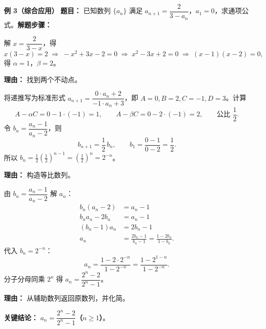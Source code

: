 \begin{examplebox}
	\medskip
	\textbf{\textcolor{CExample}{例 3（综合应用）}}
	\textbf{\textcolor{CExample}{题目：}} 已知数列 $\{a_n\}$ 满足 $a_{n+1}=\dfrac{2}{3-a_n}$，$a_1=0$，求通项公式。\textbf{\textcolor{CExample}{解题步骤：}}
	\begin{description}[style=nextline, leftmargin=2.8em, labelsep=0.5em, itemsep=0.45em]
		\item[\textbf{第一步（不动点求解）：}]
			解 $x=\dfrac{2}{3-x}$，得
			\[
				x(3-x)=2\;\Longrightarrow\; -x^2+3x-2=0\;\Longrightarrow\; x^2-3x+2=0\;\Longrightarrow\; (x-1)(x-2)=0,
			\]
			得 $\alpha=1$，$\beta=2$。
			\par\textbf{理由：} 找到两个不动点。
		\item[\textbf{第二步（构造等比）：}]
			将递推写为标准形式 $a_{n+1}=\dfrac{0\cdot a_n+2}{-1\cdot a_n+3}$，即 $A=0,B=2,C=-1,D=3$。计算
			\[
				A-\alpha C = 0-1\cdot(-1)=1,
				\qquad
				A-\beta C = 0-2\cdot(-1)=2,
				\qquad\text{公比 } \frac12.
			\]
			令 $b_n=\dfrac{a_n-1}{a_n-2}$，则
			\[
				b_{n+1}=\frac12\,b_n,
				\qquad
				b_1=\frac{0-1}{0-2}=\frac12.
			\]
			所以 $\displaystyle b_n = \frac12\left(\frac12\right)^{\!n-1} = \left(\frac12\right)^{\!n} = 2^{-n}$。
			\par\textbf{理由：} 构造等比数列。
		\item[\textbf{第三步（反解通项）：}]
			由 $b_n=\dfrac{a_n-1}{a_n-2}$ 解 $a_n$：
			\[
				\begin{aligned}
					b_n(a_n-2) &= a_n-1 \\ b_n a_n -2b_n &= a_n-1 \\ (b_n-1)a_n &= 2b_n-1 \\ a_n &= \frac{2b_n-1}{b_n-1} = \frac{1-2b_n}{1-b_n}.
			\end{aligned}
			\]
			代入 $b_n=2^{-n}$：
			\[
				a_n = \frac{1-2\cdot2^{-n}}{1-2^{-n}} = \frac{1-2^{1-n}}{1-2^{-n}}.
			\]
			分子分母同乘 $2^n$ 得 $a_n = \dfrac{2^n-2}{2^n-1}$。
			\par\textbf{理由：} 从辅助数列返回原数列，并化简。
	\end{description}
	\textbf{\textcolor{CExample}{关键结论：}}
	\textbf{$a_n = \dfrac{2^n-2}{2^n-1}$（$n\ge 1$）}。
\end{examplebox}
